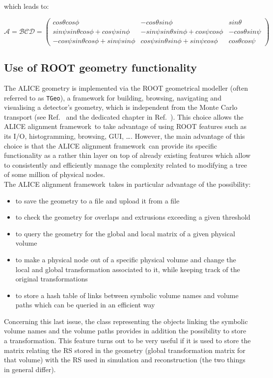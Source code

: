 \documentclass[12pt,a4paper,twoside]{article}
\makeatletter
\newcommand {\ROOT} {ROOT\@\xspace}
\newcommand{\FR}{ALICE alignment framework}
\newcommand{\tgeo}{\lstinline!TGeo!}
\makeatother
\begin{document}
{which leads to:

$$ \mathcal{A}  =  \mathcal{B} \mathcal{C} \mathcal{D} =
      \left( \begin{array}{ccc}

           cos\theta cos\phi & -cos\theta sin\phi & sin\theta \\
           sin\psi sin\theta cos\phi + cos\psi sin\phi & -sin\psi
           sin\theta sin\phi+cos\psi cos\phi & -cos\theta sin\psi \\
           -cos\psi sin\theta cos\phi+sin\psi sin\phi & cos\psi
           sin\theta sin\phi + sin\psi cos\phi & cos\theta cos\psi

      \end{array} \right) $$

\subsection{Use of \ROOT geometry functionality}
\label{sec:ROOT}
The ALICE geometry is implemented via the \ROOT geometrical modeller
(often referred to as \tgeo), a framework for building, browsing,
navigating and visualising a detector's geometry, which is independent
from the Monte Carlo transport (see Ref.~\cite{tgeo} and the dedicated
chapter in Ref.~\cite{rootUG}). This choice allows the \FR\ to take
advantage of using \ROOT features such as its I/O,
histogramming, browsing, GUI, \ldots.  However, the main advantage of
this choice is that the \FR\ can provide its specific functionality as
a rather thin layer on
top of already existing features which allow to consistently and
efficiently manage the complexity related to modifying a tree of some
million of physical nodes.\\ The \FR\ takes in particular advantage of
the possibility:
\begin{itemize}
  \item to save the geometry to a file and upload it from a file
  \item to check the geometry for overlaps and extrusions exceeding a
  given threshold
  \item to query the geometry for the global and local matrix of a given
  physical volume
  \item to make a physical node out of a specific physical volume and
  change the local and global transformation associated to it, while
  keeping track of the original transformations
  \item to store a hash table of links between symbolic volume
  names and volume paths which can be queried in an efficient way
\end{itemize}
Concerning this last issue, the class representing the objects linking
the symbolic volume names and the volume paths provides in addition
the possibility to store a transformation. This feature turns out to be very
useful if it is used to store the matrix relating the RS stored in the
geometry (global transformation matrix for that volume) with the RS
used in simulation and reconstruction (the two things in general differ).


}
\end{document}
